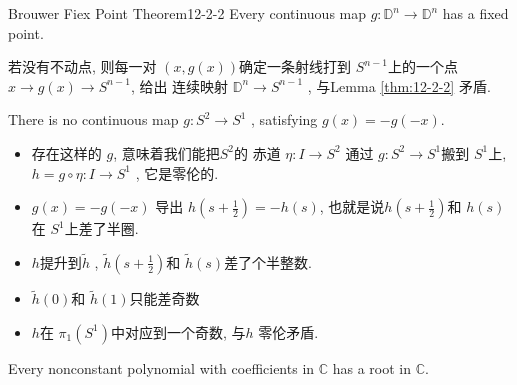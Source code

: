\documentclass[../main.tex]{subfiles}
\begin{document}
\begin{theorem}{Brouwer Fiex Point Theorem}{12-2-2}
    Every continuous map \(  g: \mathbb{D}^{n}\to \mathbb{D}^{n}  \) has a fixed point. 
\end{theorem}

\begin{proofsketch}
    若没有不动点, 则每一对 \(  \left( x,g\left( x \right)  \right)   \)确定一条射线打到 \(  S^{n-1}  \)上的一个点  \( x \to g\left( x \right)  \to S^{n-1}\), 给出 连续映射 \(  \mathbb{D}^{n}\to S^{n-1}  \) , 与Lemma \ref{thm:12-2-2} 矛盾.
\end{proofsketch}

\begin{lemma}{}{}
    There is no continuous map \(  g: S^{2}\to S^{1}  \) , satisfying \(  g\left( x \right)= -g\left( -x \right)    \). 
\end{lemma}

\begin{proofsketch}
    \begin{itemize}
        \item 存在这样的 \(  g  \), 意味着我们能把\(  S^{2}  \)的 赤道 \(  \eta : I\to S^{2}  \) 通过 \(  g  : S^{2}\to S^{1}\)搬到  \(  S^{1}  \)上, \(  h= g\circ \eta : I\to S^{1}  \) , 它是零伦的.
        \item \(  g\left( x \right)= -g\left( -x \right)    \) 导出 \(  h\left( s+ \frac{1}{2} \right)= -h\left( s \right)    \), 也就是说\(  h\left( s+ \frac{1}{2} \right)   \)和 \(  h\left( s \right)   \)在 \(  S^{1}  \)上差了半圈.
        \item \(  h  \)提升到\(  \tilde{h}  \) , \(  \tilde{h}\left( s+ \frac{1}{2} \right)   \)和 \(  \tilde{h}\left( s \right)   \)差了个半整数.
        \item \(  \tilde{h}\left( 0 \right)   \)和 \(  \tilde{h}\left( 1 \right)   \)只能差奇数        
        \item \(  h  \)在 \(   \pi _1 \left( S^{1} \right)   \)中对应到一个奇数, 与\(  h  \) 零伦矛盾.   
    \end{itemize}
     
\end{proofsketch}

\begin{theorem}{}{}
Every nonconstant polynomial with coefficients in \(\mathbb{C}\) has a root in \(\mathbb{C}\).
\end{theorem}
\end{document}
